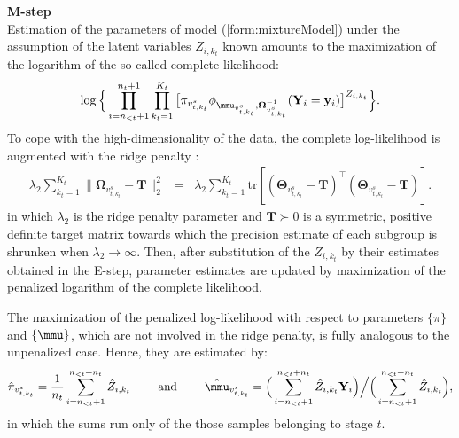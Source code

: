 \documentclass[10pt]{article}
\begin{document}
\\
\\
\textbf{M-step}
\\
Estimation of the parameters of model (\ref{form:mixtureModel}) under the assumption of the latent variables $Z_{i, k_t}$ known amounts to the maximization of the logarithm of the so-called complete likelihood:
\begin{eqnarray*}
\log \Big\{
\prod_{i=n_{<t}+1}^{n_t + 1} \prod_{k_t = 1}^{K_t} \big[ \pi_{v_{t, k_t}^s} \phi_{\mmu_{v_{t, k_t}^s}, \mathbf{\Omega}_{v_{t, k_t}^s}^{-1}} ( \mathbf{Y}_i = \mathbf{y}_i ) \big]^{Z_{i, k_t}} \Big\}.
\end{eqnarray*}
To cope with the high-dimensionality of the data, the complete log-likelihood is augmented with the ridge penalty \citep{VWie2014b}:
\begin{eqnarray*}
\lambda_2 \sum_{k_t=1}^{K_t}  \| \mathbf{\Omega}_{v^s_{t, k_t}} - \mathbf{T} \|_2^2 & = &  \lambda_2 \sum_{k_t=1}^{K_t} \mbox{tr} [ (\mathbf{\Theta}_{v_{t, k_t}^s} - \mathbf{T})^{\top} (\mathbf{\Theta}_{v_{t, k_t}^s} - \mathbf{T})].
\end{eqnarray*}
in which $\lambda_2$ is the ridge penalty parameter and $\mathbf{T} \succ 0$ is a symmetric, positive definite target matrix towards which the precision estimate of each subgroup is shrunken when $\lambda_2 \rightarrow \infty$. Then, after substitution of the $Z_{i, k_t}$  by their estimates obtained in the E-step, parameter estimates are updated by maximization of the penalized logarithm of the complete likelihood.

The maximization of the penalized log-likelihood with respect to parameters $\{ \pi \}$ and $\{ \mmu \}$, which are not involved in the ridge penalty, is fully analogous to the unpenalized case. Hence, they are estimated by:
\begin{eqnarray*}
\hat{\pi}_{v_{t, k_t}^s} = \frac{1}{n_t} \sum_{i=n_{<t}+1}^{n_{<t}+n_t} \hat{Z}_{i, k_t}  \qquad \mbox{ and } \qquad \hat{\mmu}_{v_{t, k_t}^s} = \Big( \sum_{i=n_{<t}+1}^{n_{<t}+n_t} \hat{Z}_{i, k_t} \mathbf{Y}_i \Big)  \Big/  \Big( \sum_{i=n_{<t}+1}^{n_{<t}+n_t} \hat{Z}_{i,k_t} \Big),
\end{eqnarray*}
in which the sums run only of the those samples belonging to stage $t$.
\end{document}
